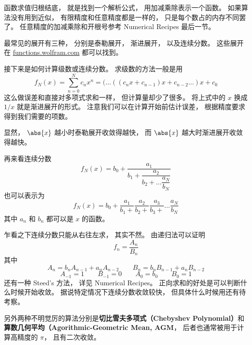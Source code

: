 
函数求值归根结底， 就是找到一个解析公式， 用加减乘除表示一个函数。 如果算法没有用到近似， 有限精度和任意精度都是一样的， 只是每个数占的内存不同罢了。 任意精度的加减乘除和开根号参考 Numerical Recipes 最后一节。

最常见的展开有三种， 分别是泰勒展开， 渐进展开， 以及连续分数。 这些展开在 \href{http://functions.wolfram.com}{functions.wolfram.com} 都可以找到。

接下来是如何计算级数或连续分数。 求级数的方法一般是用
\begin{equation}
f_N(x) = \sum_{n = 0}^N c_n x^n = (\dots ((c_n x + c_{n-1})x + c_{n-2} \dots )x + c_0
\end{equation}
这么做误差和直接对多项式求和一样， 但计算量却少了很多。 将上式中的 $x$ 换成 $1/x$ 就是渐进展开的形式。 注意我们可以在计算开始前估计误差， 根据精度要求得到我们需要的项数。

显然， $\abs{x}$ 越小时泰勒展开收敛得越快， 而 $\abs{x}$ 越大时渐进展开收敛得越快。

再来看连续分数
\begin{equation}
f_N(x) = b_0 + \dfrac{a_1}{b_1 + \dfrac{a_2}{b_2 + \dots \dfrac{a_N}{b_N}}}
\end{equation}
也可以表示为
\begin{equation}
f_N(x) = b_0 + \frac{a_1}{b_1 +} \frac{a_2}{b_2 +} \frac{a_3}{b_3 +} \dots \frac{a_N}{b_N}
\end{equation}
其中 $a_n$ 和 $b_n$ 都可以是 $x$ 的函数。

乍看之下连续分数只能从右往左求， 其实不然。 由递归法可以证明
\begin{equation}
f_n = \frac{A_n}{B_n}
\end{equation}
其中
\begin{equation}
A_n = b_n A_{n-1} + a_n A_{n-2} \qquad
B_n = b_n B_{n-1} + a_n B_{n-2}
\end{equation}
\begin{equation}
A_{-1} = 1 \qquad B_{-1} = 0
\qquad A_0 = b_0 \qquad B_0 = 1
\end{equation}
还有一种 Steed's 方法， 详见 Numerical Recipes。 正向求和的好处是可以判断什么时候开始收敛。
据说特定情况下连续分数收敛较快， 但具体什么时候用还有待考察。

另外两种不明觉厉的算法分别是\textbf{切比雪夫多项式（Chebyshev Polynomial）}和\textbf{算数几何平均（Agorithmic-Geometric Mean, AGM}， 后者也通常被用于计算高精度的 $\pi$， 且有二次收敛。
